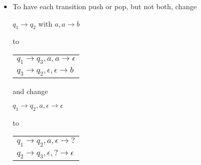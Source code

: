 \begin{frame}[allowframebreaks]
\begin{itemize}
\item  To have each transition push or pop, but not both,
change
\begin{center}
$q_1 \rightarrow q_2$ with $a, a \rightarrow b$ 
\end{center}
to
\begin{center}
  \begin{tabular}{l}
$q_1 \rightarrow q_3, a, a \rightarrow \epsilon$\\
$q_3 \rightarrow q_2, \epsilon, \epsilon \rightarrow b$  
  \end{tabular}
\end{center}
and change 
\begin{center}
$q_1\rightarrow q_2, a, \epsilon \rightarrow \epsilon$ 
\end{center}
to
\begin{center}
  \begin{tabular}{l}
$q_1 \rightarrow q_2, a, \epsilon \rightarrow ?$ \\
$q_2 \rightarrow q_3, \epsilon, ? \rightarrow \epsilon$
  \end{tabular}
\end{center}
  \end{itemize}
\end{frame}





